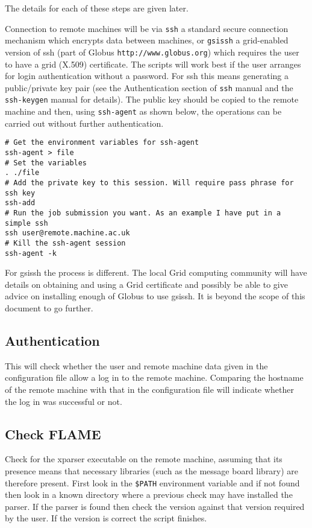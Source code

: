 The details for each of these steps are given later.

Connection to remote machines will be via \texttt{ssh} a standard secure connection mechanism which encrypts data between machines, or \texttt{gsissh} a grid-enabled version of ssh (part of Globus \verb+http://www.globus.org+) which requires the user to have a grid (X.509) certificate. The scripts will work best if the user arranges for login authentication without a password. For ssh this means generating a public/private key pair (see the Authentication section of \texttt{ssh} manual and the \texttt{ssh-keygen} manual for details). The public key should be copied to the remote machine and then, using \texttt{ssh-agent} as shown below, the operations can be carried out without further authentication.

\begin{verbatim}
# Get the environment variables for ssh-agent
ssh-agent > file
# Set the variables
. ./file
# Add the private key to this session. Will require pass phrase for ssh key
ssh-add
# Run the job submission you want. As an example I have put in a simple ssh
ssh user@remote.machine.ac.uk
# Kill the ssh-agent session
ssh-agent -k	
\end{verbatim}


For gsissh the process is different. The local Grid computing community will have details on obtaining and using a Grid certificate and possibly be able to give advice on installing enough of Globus to use gsissh. It is beyond the scope of this document to go further.

\subsection{Authentication}

This will check whether the user and remote machine data given in the configuration file allow a log in to the remote machine. Comparing the hostname of the remote machine with that in the configuration file will indicate whether the log in was successful or not.

\subsection{Check FLAME}

Check for the xparser executable on the remote machine, assuming that its presence means that necessary libraries (such as the message board library) are therefore present. First look in the \texttt{\$PATH} environment variable and if not found then look in a known directory where a previous check may have installed the parser. If the parser is found then check the version against that version required by the user. If the version is correct the script finishes. 

